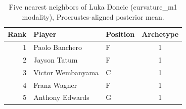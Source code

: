 \begin{table}[htbp]
  \centering\small
  \begin{tabular}{rllc}
    \toprule
    Rank & Player & Position & Archetype \\
    \midrule
    1 & Paolo Banchero & F & 1 \\
    2 & Jayson Tatum & F & 1 \\
    3 & Victor Wembanyama & C & 1 \\
    4 & Franz Wagner & F & 1 \\
    5 & Anthony Edwards & G & 1 \\
    \bottomrule
  \end{tabular}
  \caption{Five nearest neighbors of Luka Doncic (curvature_m1 modality), Procrustes-aligned posterior mean.}
  \label{tab:Luka_Doncic_neighbors_curvature_m1}
\end{table}

